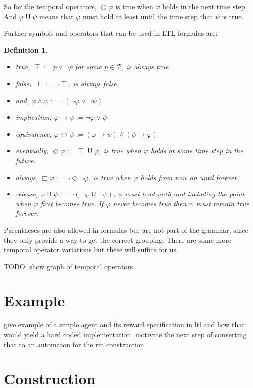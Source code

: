 \documentclass[12pt, a4paper]{article}
\theoremstyle{plain}
\newtheorem*{definition}{Definition}
\DeclareMathOperator{\true}{\top}
\DeclareMathOperator{\false}{\bot}
\DeclareMathOperator{\an}{\wedge}
\DeclareMathOperator{\od}{\vee}
\DeclareMathOperator{\imply}{\rightarrow}
\DeclareMathOperator{\equivalent}{\leftrightarrow}
\DeclareMathOperator{\nxt}{\bigcirc}
\DeclareMathOperator{\until}{\textsf{U}}
\DeclareMathOperator{\release}{\textsf{R}}
\DeclareMathOperator{\eventually}{\Diamond}
\DeclareMathOperator{\always}{\Box}
\renewcommand{\phi}{\varphi}
\renewcommand{\P}{\mathcal{P}}
\begin{document}
So for the temporal operators, $\nxt\phi$ is true when $\phi$ holds in the next time step. And $\phi\until\psi$ means that $\phi$ must hold at least until the time step that $\psi$ is true.

Further symbols and operators that can be used in LTL formulas are:

\begin{definition}
	\
	\begin{itemize}
		\item \emph{true}, $\true := p\od\neg p$ for some $p \in \P$, is always true
		\item \emph{false}, $\false := \neg\true$, is always false
		\item \emph{and}, $\phi\an\psi := \neg(\neg\phi\od\neg\psi)$
		\item \emph{implication}, $\phi\imply\psi := \neg\phi\od\psi$
		\item \emph{equivalence}, $\phi\equivalent\psi := (\phi\imply\psi) \an (\psi\imply\phi)$
		\item \emph{eventually}, $\eventually\phi := \true\until\phi$, is true when $\phi$ holds at some time step in the future.
		\item \emph{always}, $\always\phi := \neg\eventually\neg\phi$, is true when $\phi$ holds from now on until forever.
		\item \emph{release}, $\phi\release\psi := \neg(\neg\phi\until\neg\psi)$, $\psi$ must hold until and including the point when $\phi$ first becomes true. If $\phi$ never becomes true then $\psi$ must remain true forever.
	\end{itemize}
\end{definition}

Parentheses are also allowed in formulas but are not part of the grammar, since they only provide a way to get the correct grouping. There are some more temporal operator variations but these will suffice for us.

TODO: show graph of temporal operators

\section*{Example}

give example of a simple agent and its reward specification in ltl and how that would yield a hard coded implementation. motivate the next step of converting that to an automaton for the rm construction

\section*{Construction}
\end{document}
